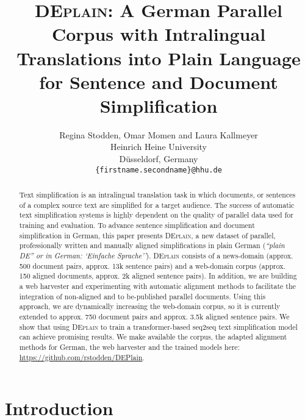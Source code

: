 \documentclass[11pt]{article}
\title{\textsc{DEplain}: A German Parallel Corpus with Intralingual Translations into Plain Language for Sentence and Document Simplification}
\author{Regina Stodden\textmd{,} Omar Momen \textmd{and} Laura Kallmeyer\\
  Heinrich Heine University \\
  Düsseldorf, Germany \\
  \texttt{\{firstname.secondname\}@hhu.de} \\ 
}
\begin{document}
\maketitle
\begin{abstract}
Text simplification is an intralingual translation task in which documents, or sentences of a complex source text are simplified for a target audience. The success of automatic text simplification systems is highly dependent on the quality of parallel data used for training and evaluation. To advance sentence simplification and document simplification in German, this paper presents \textsc{DEplain}, a new dataset of parallel, professionally written and manually aligned simplifications in plain German (\emph{``plain DE'' or in German: `Einfache Sprache''}). \textsc{DEplain} consists of a news-domain (approx. 500 document pairs, approx. 13k sentence pairs) and a web-domain corpus (approx. 150 aligned documents, approx. 2k aligned sentence pairs). In addition, we are building a web harvester and experimenting with automatic alignment methods to facilitate the integration of non-aligned and to be-published parallel
documents. 
Using this approach, we are dynamically increasing the web-domain corpus, so it is currently extended to approx. 750 document pairs and approx. 3.5k aligned sentence pairs. We show that using \textsc{DEplain} to train a transformer-based seq2seq text simplification model can achieve promising results. We make available the corpus, the adapted alignment methods for German, the web harvester and the trained models here: \url{https://github.com/rstodden/DEPlain}.


\end{abstract}



\section{Introduction}
\end{document}
